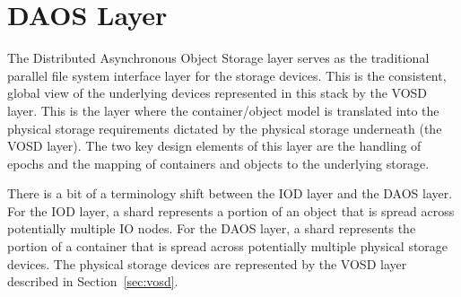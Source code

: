 \documentclass{sig-alt-gov2}
\begin{document}
\section{DAOS Layer}
\label{sec:daos}

The Distributed Asynchronous Object Storage layer serves as the traditional
parallel file system interface layer for the storage devices. This is the
consistent, global view of the underlying devices represented in this stack
by the VOSD layer.
This is the layer where the container/object model is translated into the
physical storage requirements dictated by the physical storage underneath (the
VOSD layer). The two key design elements of this layer are the handling of
epochs and the mapping of containers and objects to the underlying storage.

There is a bit of a terminology shift between the IOD layer and the DAOS
layer. For the IOD layer, a shard represents a portion of an object that is
spread across potentially multiple IO nodes. For the DAOS layer, a shard
represents the portion of a container that is spread across potentially
multiple physical storage devices.  The physical storage devices are
represented by the VOSD layer described in Section~\ref{sec:vosd}.



\end{document}
